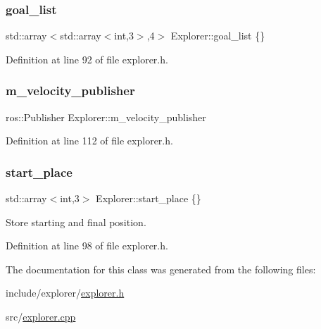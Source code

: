 \subsubsection{\texorpdfstring{goal\+\_\+list}{goal\_list}}
{\footnotesize\ttfamily std\+::array$<$std\+::array$<$int,3$>$,4$>$ Explorer\+::goal\+\_\+list \{\}}



Definition at line 92 of file explorer.\+h.

\mbox{\label{class_explorer_aee857cd646f2ce6eb7e017a67e90bcdf}} 
\subsubsection{\texorpdfstring{m\+\_\+velocity\+\_\+publisher}{m\_velocity\_publisher}}
{\footnotesize\ttfamily ros\+::\+Publisher Explorer\+::m\+\_\+velocity\+\_\+publisher}



Definition at line 112 of file explorer.\+h.

\mbox{\label{class_explorer_af1aee46522a58db39d3643f2138c76fa}} 
\subsubsection{\texorpdfstring{start\+\_\+place}{start\_place}}
{\footnotesize\ttfamily std\+::array$<$int,3$>$ Explorer\+::start\+\_\+place \{\}}



Store starting and final position. 



Definition at line 98 of file explorer.\+h.



The documentation for this class was generated from the following files\+:\begin{DoxyCompactItemize}
\item 
include/explorer/\hyperlink{explorer_8h}{explorer.\+h}\item 
src/\hyperlink{explorer_8cpp}{explorer.\+cpp}\end{DoxyCompactItemize}
